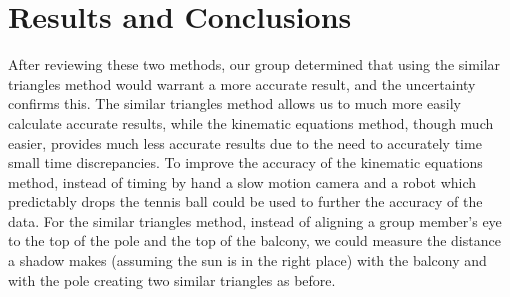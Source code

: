 \documentclass[12pt]{article}
\begin{document}
\section{Results and Conclusions} %
After reviewing these two methods, our group determined that using the similar triangles method would warrant a more accurate result, and the uncertainty confirms this. The similar triangles method allows us to much more easily calculate accurate results, while the kinematic equations method, though much easier, provides much less accurate results due to the need to accurately time small time discrepancies. To improve the accuracy of the kinematic equations method, instead of timing by hand a slow motion camera and a robot which predictably drops the tennis ball could be used to further the accuracy of the data. For the similar triangles method, instead of aligning a group member's eye to the top of the pole and the top of the balcony, we could measure the distance a shadow makes (assuming the sun is in the right place) with the balcony and with the pole creating two similar triangles as before.
\end{document}
